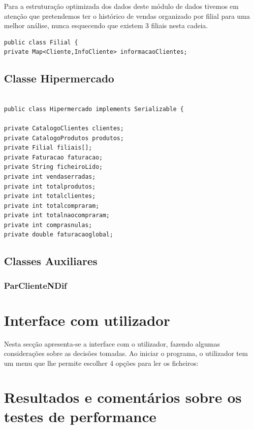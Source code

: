  Para a estruturação optimizada dos dados deste módulo de dados tivemos em atenção que pretendemos ter o histórico de vendas organizado por filial para uma melhor análise, nunca esquecendo que existem 3 filiais nesta cadeia. 


\begin{verbatim}
public class Filial {
private Map<Cliente,InfoCliente> informacaoClientes; 
\end{verbatim}

\section{Classe Hipermercado }

\begin{verbatim}

public class Hipermercado implements Serializable {

private CatalogoClientes clientes;
private CatalogoProdutos produtos;
private Filial filiais[];
private Faturacao faturacao;
private String ficheiroLido;
private int vendaserradas;
private int totalprodutos;
private int totalclientes;
private int totalcompraram;
private int totalnaocompraram;
private int comprasnulas;
private double faturacaoglobal;
\end{verbatim}

\section{Classes Auxiliares}

\subsection{ParClienteNDif}




\chapter{Interface com utilizador}

Nesta secção apresenta-se a interface com o utilizador, fazendo algumas considerações sobre as decisões tomadas.
Ao iniciar o programa, o utilizador tem um menu que lhe permite escolher 4 opções para ler os ficheiros:




\chapter{Resultados e comentários sobre os testes de performance}

